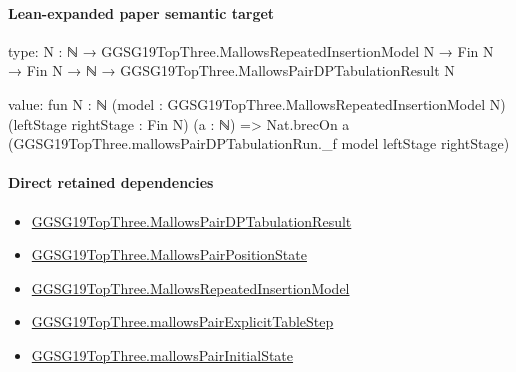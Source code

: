 \documentclass[10pt]{article}
\begin{document}
\paragraph{Lean-expanded paper semantic target}
\begin{ReviewVerbatim}
type:
{N : ℕ} →
  GGSG19TopThree.MallowsRepeatedInsertionModel N → Fin N → Fin N → ℕ → GGSG19TopThree.MallowsPairDPTabulationResult N

value:
fun {N : ℕ} (model : GGSG19TopThree.MallowsRepeatedInsertionModel N) (leftStage rightStage : Fin N) (a : ℕ) =>
  Nat.brecOn a (GGSG19TopThree.mallowsPairDPTabulationRun._f model leftStage rightStage)
\end{ReviewVerbatim}

\paragraph{Direct retained dependencies}
\begin{itemize}\raggedright
\item \hyperlink{governing-declaration-a39ebf66eadffdd2}{GGSG19\allowbreak{}Top\allowbreak{}Three.\allowbreak{}Mallows\allowbreak{}Pair\allowbreak{}DP\allowbreak{}Tabulation\allowbreak{}Result}
\item \hyperlink{governing-declaration-333b63f7b86e0c45}{GGSG19\allowbreak{}Top\allowbreak{}Three.\allowbreak{}Mallows\allowbreak{}Pair\allowbreak{}Position\allowbreak{}State}
\item \hyperlink{governing-declaration-9983481a44dbf0cf}{GGSG19\allowbreak{}Top\allowbreak{}Three.\allowbreak{}Mallows\allowbreak{}Repeated\allowbreak{}Insertion\allowbreak{}Model}
\item \hyperlink{governing-declaration-e5ca92f8d494bc96}{GGSG19\allowbreak{}Top\allowbreak{}Three.\allowbreak{}mallows\allowbreak{}Pair\allowbreak{}Explicit\allowbreak{}Table\allowbreak{}Step}
\item \hyperlink{governing-declaration-581429e4f89cbcae}{GGSG19\allowbreak{}Top\allowbreak{}Three.\allowbreak{}mallows\allowbreak{}Pair\allowbreak{}Initial\allowbreak{}State}
\end{itemize}
\end{document}
